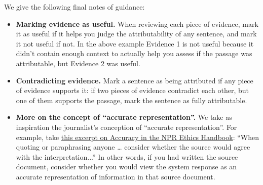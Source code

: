 We give the following final notes of guidance:
\begin{itemize}
\item  \textbf{Marking evidence as useful.} When reviewing each piece of evidence, mark it as useful if it helps you judge the attributability of any sentence, and mark it not useful if not. In the above example Evidence 1 is not useful because it didn't contain enough context to actually help you assess if the passage was attributable, but Evidence 2 was useful.
\item
\textbf{Contradicting evidence.} Mark a sentence as being attributed if any piece of evidence supports it: if two pieces of evidence contradict each other, but one of them supports the passage, mark the sentence as fully attributable.
\item
\textbf{More on the concept of ``accurate representation''.} We take as inspiration the journalist's conception of ``accurate representation''. For example, take \href{https://www.npr.org/about-npr/688139552/accuracy}{this excerpt on Accuracy in the NPR Ethics Handbook}: ``When quoting or paraphrasing anyone … consider whether the source would agree with the interpretation...'' In other words, if you had written the source document, consider whether you would view the system response as an accurate representation of information in that source document.
\end{itemize}



